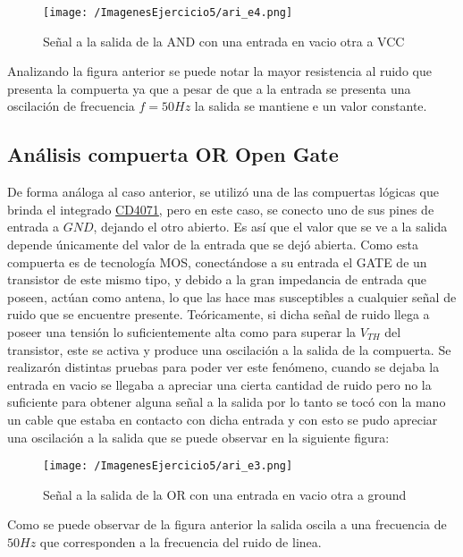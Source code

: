 \begin{figure}[H]
    \centering
    \texttt{[image: /ImagenesEjercicio5/ari\_e4.png]}
    \caption{Señal a la salida de la AND con una entrada en vacio otra a VCC}
\end{figure}

Analizando la figura anterior se puede notar la mayor resistencia al ruido que presenta la compuerta ya que a pesar de que a la entrada se presenta una oscilación de frecuencia $f=50 Hz$ la salida se mantiene e un valor constante.



\subsection{Análisis compuerta OR Open Gate}

De forma análoga al caso anterior, se utilizó una de las compuertas lógicas que brinda el integrado \href{http://www.ti.com/lit/ds/symlink/cd4071b.pdf}{CD4071}, pero en este caso, se conecto uno de sus pines de entrada a $GND$, dejando el otro abierto. Es así que el valor que se ve a la salida depende únicamente del valor de la entrada que se dejó abierta. Como esta compuerta es de tecnología MOS, conectándose a su entrada el GATE de un transistor de este mismo tipo, y debido a la gran impedancia de entrada que poseen, actúan como antena, lo que las hace mas susceptibles a cualquier señal de ruido que se encuentre presente. Teóricamente, si dicha señal de ruido llega a poseer una tensión lo suficientemente alta como para superar la $V_{TH}$ del transistor, este se activa y produce una oscilación a la salida de la compuerta. Se realizarón distintas pruebas para poder ver este fenómeno, cuando se dejaba la entrada en vacio se llegaba a apreciar una cierta cantidad de ruido pero no la suficiente para obtener alguna señal a la salida por lo tanto se tocó con la mano un cable que estaba en contacto con dicha entrada y con esto se pudo apreciar una oscilación a la salida que se puede observar en la siguiente figura:


\begin{figure}[H]
    \centering
    \texttt{[image: /ImagenesEjercicio5/ari\_e3.png]}
    \caption{Señal a la salida de la OR con una entrada en vacio otra a ground}
    
\end{figure}

Como se puede observar de la figura anterior la salida oscila a una frecuencia de $50 Hz$ que corresponden a la frecuencia del ruido de linea.


